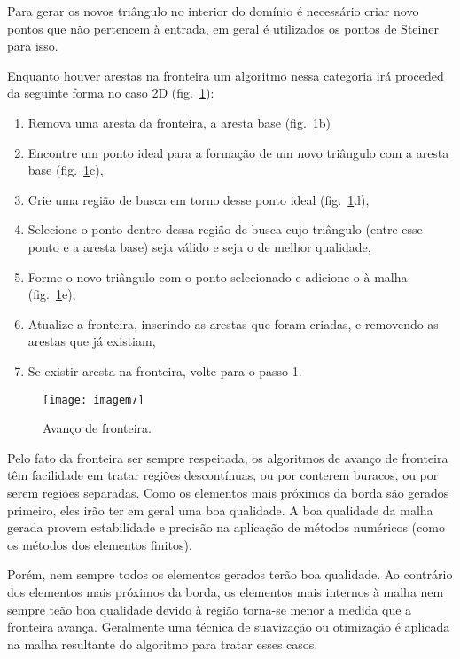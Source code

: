 Para gerar os novos triângulo no interior do domínio é necessário criar novo pontos que não pertencem à entrada, em geral é utilizados os pontos de Steiner para isso.

Enquanto houver arestas na fronteira um algoritmo nessa categoria irá proceded da seguinte forma no caso 2D (fig.~\ref{fig:imagem7}):
 
 \begin{enumerate}
\item{ Remova uma aresta da fronteira, a aresta base (fig.~\ref{fig:imagem7}b)}
\item{ Encontre um ponto ideal para a formação de um novo triângulo com a aresta base (fig.~\ref{fig:imagem7}c),}
\item{ Crie uma região de busca em torno desse ponto ideal (fig.~\ref{fig:imagem7}d),}
\item{ Selecione o ponto dentro dessa região de busca cujo triângulo (entre esse ponto e a aresta base) seja válido e seja o de melhor qualidade,}
\item{ Forme o novo triângulo com o ponto selecionado e adicione-o à malha (fig.~\ref{fig:imagem7}e),}
\item{ Atualize a fronteira, inserindo as arestas que foram criadas, e removendo as arestas que já existiam,}
\item{ Se existir aresta na fronteira, volte para o passo 1.}
\end{enumerate}

 \begin{figure}[htbp]
     \centering
     \texttt{[image: imagem7]}
     \caption{Avanço de fronteira. \cite{bib:Freitas10}} 
     \label{fig:imagem7}
 \end{figure}

 Pelo fato da fronteira ser sempre respeitada, os algoritmos de avanço de fronteira têm facilidade em tratar regiões descontínuas, ou por conterem buracos, ou por serem regiões separadas. Como os elementos mais próximos da borda são gerados primeiro, eles irão ter em geral uma boa qualidade. A boa qualidade da malha gerada provem estabilidade e precisão na aplicação de métodos numéricos (como os métodos dos elementos finitos).

Porém, nem sempre todos os elementos gerados terão boa qualidade. Ao contrário dos elementos mais próximos da borda, os elementos mais internos à malha nem sempre teão boa qualidade devido à região torna-se menor a medida que a fronteira avança. Geralmente uma técnica de suavização ou otimização é aplicada na malha resultante do algoritmo para tratar esses casos.

